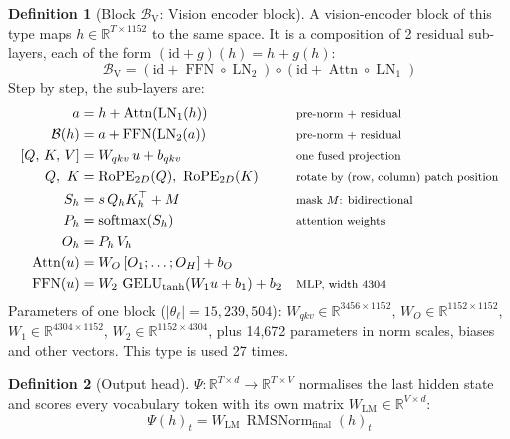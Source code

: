\documentclass[10pt,a4paper]{article}
\newcommand{\op}[1]{\operatorname{#1}}
\theoremstyle{definition}
\newtheorem{definition}{Definition}[section]
\begin{document}
\begin{definition}[Block $\mathcal{B}_{\mathrm{V}}$: Vision encoder block]
A vision-encoder block of this type maps $h\in\mathbb{R}^{T\times 1152}$ to the same space. It is a composition of 2 residual sub-layers, each of the form $(\mathrm{id}+g)(h)=h+g(h)$:
\begin{equation}
  \mathcal{B}_{\mathrm{V}} = (\mathrm{id}+\op{FFN}\circ \op{LN}_{2})\circ(\mathrm{id}+\op{Attn}\circ \op{LN}_{1})
\end{equation}
Step by step, the sub-layers are:
\begin{align*}
  a &= h + \op{Attn}(\op{LN}_{1}(h)) && \text{\footnotesize pre-norm + residual} \\
  \mathcal{B}(h) &= a + \op{FFN}(\op{LN}_{2}(a)) && \text{\footnotesize pre-norm + residual} \\
  [Q,\,K,\,V] &= W_{qkv}\,u + b_{qkv} && \text{\footnotesize one fused projection} \\
  Q,\ K &= \op{RoPE}_{2D}(Q),\ \op{RoPE}_{2D}(K) && \text{\footnotesize rotate by (row, column) patch position} \\
  S_h &= s\, Q_h K_h^{\top} + M && \text{\footnotesize mask $M$: bidirectional} \\
  P_h &= \op{softmax}(S_h) && \text{\footnotesize attention weights} \\
  O_h &= P_h\, V_h \\
  \op{Attn}(u) &= W_O\,[O_1;\dots;O_H] + b_O \\
  \op{FFN}(u) &= W_2\,\op{GELU}_{\tanh}(W_1 u + b_1) + b_2 && \text{\footnotesize MLP, width 4304}
\end{align*}
Parameters of one block ($|\theta_\ell|=15{,}239{,}504$): $W_{qkv}\in\mathbb{R}^{3456\times1152}$, $W_O\in\mathbb{R}^{1152\times1152}$, $W_1\in\mathbb{R}^{4304\times1152}$, $W_2\in\mathbb{R}^{1152\times4304}$, plus 14,672 parameters in norm scales, biases and other vectors. This type is used 27 times.
\end{definition}
\begin{definition}[Output head]
$\Psi:\mathbb{R}^{T\times d}\to\mathbb{R}^{T\times V}$ normalises the last hidden state and scores every vocabulary token with its own matrix $W_{\mathrm{LM}}\in\mathbb{R}^{V\times d}$:
\begin{equation}
  \Psi(h)_t = W_{\mathrm{LM}}\,\op{RMSNorm}_{\mathrm{final}}(h)_t
\end{equation}
\end{definition}
\end{document}
